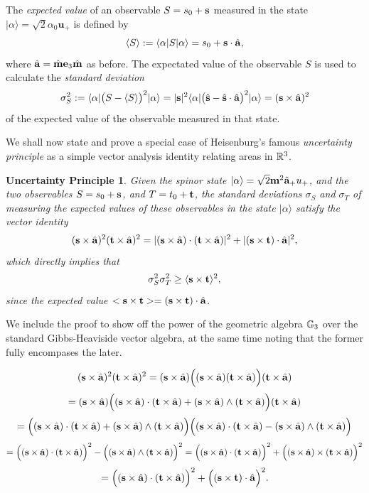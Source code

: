 \documentclass[]{article}
\newtheorem{uncertainty}{Uncertainty Principle}[section]
\begin{document}
The {\it expected value} of an observable $S=s_0 + \mathbf{s}$ measured in the state $|\alpha \rangle=\sqrt 2\alpha_0\bm u_+$ is defined by
\[  \langle S \rangle:= \langle \alpha |S|  \alpha \rangle = s_0+\mathbf{s} \cdot \hat{\mathbf{a}}, \]
where $\hat {\mathbf{a}} = \hat {\mathbf{m}} \mathbf{e}_3 \hat {\mathbf{m}}$ as before. The expectated value of the observable $S$ is used to calculate
the {\it standard deviation}
\[ \sigma_S^2 := \langle \alpha |\big( S-\langle S \rangle \big)^2|\alpha \rangle =
               |\mathbf{s}|^2  \langle \alpha |\big( \hat{\mathbf{s}} - \hat{\mathbf{s}} \cdot \hat {\mathbf{a}} \big)^2|\alpha \rangle=(\mathbf{s}\times \hat {\mathbf{a}})^2\]
 of the expected value of the observable measured in that state.              
               
  We shall now state and prove a special case of Heisenburg's famous {\it uncertainty principle} as a simple vector analysis identity 
  relating areas in $\mathbb{R}^3$.

\begin{uncertainty} \label{uncertainppl} Given the spinor state $|\alpha\rangle=\sqrt 2 \mathbf{m}^2 \hat {\mathbf{a}}_+u_+$, and the two observables 
$ S=s_0+\mathbf{s}$, and $T=t_0+\mathbf{t}$, the standard deviations $\sigma_S$ and $\sigma_T$ of measuring 
 the expected values of these observables in the state $|\alpha\rangle$ satisfy the vector identity
\[ (\mathbf{s}\times \hat {\mathbf{a}})^2(\mathbf{t} \times \hat {\mathbf{a}})^2= |(\mathbf{s} \times \hat {\mathbf{a}})\cdot (\mathbf{t} \times \hat {\mathbf{a}})|^2 + |(\mathbf{s} \times \mathbf{t})\cdot \hat{\mathbf{a}}|^2, \]
which directly implies that
\[ \sigma_S^2\sigma_T^2 \ge \langle \mathbf{s} \times \mathbf{t}\rangle^2, \]
since the expected value $<\mathbf{s} \times \mathbf{t}>=(\mathbf{s} \times \mathbf{t})\cdot \hat {\mathbf{a}}$.
\end{uncertainty}   
 We include the proof to show off the power of the geometric algebra $\mathbb{G}_3$ over the standard
Gibbs-Heaviside vector algebra, at the same time noting that the former fully encompases the later.

\[ (\mathbf{s}\times \hat {\mathbf{a}})^2(\mathbf{t} \times \hat {\mathbf{a}})^2=(\mathbf{s}\times \hat {\mathbf{a}})\Big((\mathbf{s}\times \hat {\mathbf{a}})
(\mathbf{t} \times \hat {\mathbf{a}})\Big)(\mathbf{t} \times \hat {\mathbf{a}}) \]
\[=(\mathbf{s}\times \hat {\mathbf{a}})\Big((\mathbf{s}\times \hat {\mathbf{a}})\cdot
(\mathbf{t} \times \hat {\mathbf{a}})+(\mathbf{s}\times \hat {\mathbf{a}})\wedge
(\mathbf{t} \times \hat {\mathbf{a}})\Big)(\mathbf{t} \times \hat {\mathbf{a}})     \]
\[ =\Big((\mathbf{s}\times \hat {\mathbf{a}})\cdot
(\mathbf{t} \times \hat {\mathbf{a}})+(\mathbf{s}\times \hat {\mathbf{a}})\wedge
(\mathbf{t} \times \hat {\mathbf{a}})\Big)\Big((\mathbf{s}\times \hat {\mathbf{a}})\cdot
(\mathbf{t} \times \hat {\mathbf{a}})-(\mathbf{s}\times \hat {\mathbf{a}})\wedge
(\mathbf{t} \times \hat {\mathbf{a}})\Big) \]
\[ =\Big((\mathbf{s}\times \hat {\mathbf{a}})\cdot
(\mathbf{t} \times \hat {\mathbf{a}})\Big)^2-\Big((\mathbf{s}\times \hat {\mathbf{a}})\wedge
(\mathbf{t} \times \hat {\mathbf{a}})\Big)^2  =\Big((\mathbf{s}\times \hat {\mathbf{a}})\cdot
(\mathbf{t} \times \hat {\mathbf{a}})\Big)^2+\Big((\mathbf{s}\times \hat {\mathbf{a}})\times
(\mathbf{t} \times \hat {\mathbf{a}})\Big)^2\]
\[= \Big((\mathbf{s}\times \hat {\mathbf{a}})\cdot
(\mathbf{t} \times \hat {\mathbf{a}})\Big)^2+\Big((\mathbf{s}\times \mathbf{t})\cdot \hat {\mathbf{a}}\Big)^2.\]
\end{document}
